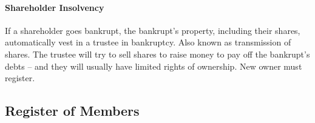\documentclass[
]{article}
\begin{document}
\hypertarget{shareholder-insolvency}{%
\paragraph{Shareholder Insolvency}\label{shareholder-insolvency}}

If a shareholder goes bankrupt, the bankrupt's property, including their
shares, automatically vest in a trustee in bankruptcy. Also known as
transmission of shares. The trustee will try to sell shares to raise
money to pay off the bankrupt's debts -- and they will usually have
limited rights of ownership. New owner must register.

\hypertarget{register-of-members}{%
\subsection{Register of Members}\label{register-of-members}}
\end{document}
